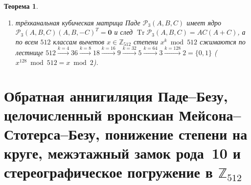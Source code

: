 \documentclass[11pt,a4paper]{article}
\theoremstyle{plain}
\newtheorem{theorem}{Теорема}[section]
\theoremstyle{definition}
\begin{document}
\begin{theorem}
\begin{enumerate}[label=\textbf{(\roman*)},leftmargin=*]
\item трёхканальная кубическая матрица Паде $\mathcal{P}_3(A,B,C)$ имеет ядро $\mathcal{P}_3(A,B,C)(A,B,-C)^T = \mathbf{0}$ и след $\operatorname{Tr}\mathcal{P}_3(A,B,C) = A C(A+C)$, а по всем $512$ классам вычетов $x\in\mathbb{Z}_{512}$ степени $x^k\bmod 512$ сжимаются по лестнице $512\xrightarrow{k=4} 36\xrightarrow{k=8} 18\xrightarrow{k=16} 9\xrightarrow{k=32} 5\xrightarrow{k=64} 3\xrightarrow{k=128} 2 = \{0,1\}$ ($x^{128}\bmod 512 = x\bmod 2$).
\end{enumerate}
\end{theorem}

\section{Обратная аннигиляция Паде--Безу, целочисленный вронскиан Мейсона--Стотерса--Безу, понижение степени на круге, межэтажный замок рода~10 и стереографическое погружение в \texorpdfstring{$\mathbb{Z}_{512}$}{Z512}}
\label{sec:universal-theorems}
\end{document}
